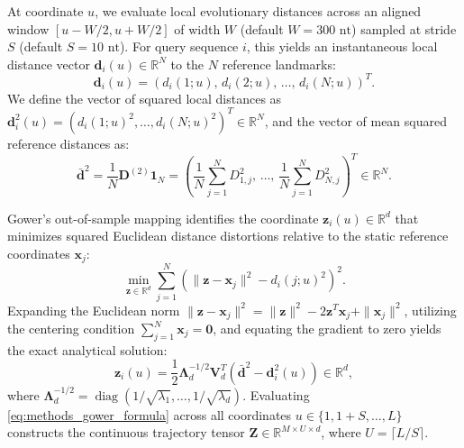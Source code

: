 At coordinate $u$, we evaluate local evolutionary distances across an aligned window $[u - W/2, u + W/2]$ of width $W$ (default $W = 300\text{ nt}$) sampled at stride $S$ (default $S = 10\text{ nt}$).
For query sequence $i$, this yields an instantaneous local distance vector $\mathbf{d}_i(u) \in \mathbb{R}^N$ to the $N$ reference landmarks:
\begin{equation}
\mathbf{d}_i(u) = \left(d_i(1; u), \, d_i(2; u), \, \dots, \, d_i(N; u)\right)^T.
\label{eq:methods_local_dist_vec}
\end{equation}
We define the vector of squared local distances as $\mathbf{d}_i^2(u) = (d_i(1; u)^2, \dots, d_i(N; u)^2)^T \in \mathbb{R}^N$, and the vector of mean squared reference distances as:
\begin{equation}
\bar{\mathbf{d}}^2 = \frac{1}{N} \mathbf{D}^{(2)} \mathbf{1}_N = \left( \frac{1}{N} \sum_{j=1}^N D_{1, j}^2, \, \dots, \, \frac{1}{N} \sum_{j=1}^N D_{N, j}^2 \right)^T \in \mathbb{R}^N.
\label{eq:methods_mean_sq_dist}
\end{equation}

Gower's out-of-sample mapping identifies the coordinate $\mathbf{z}_i(u) \in \mathbb{R}^d$ that minimizes squared Euclidean distance distortions relative to the static reference coordinates $\mathbf{x}_j$:
\begin{equation}
\min_{\mathbf{z} \in \mathbb{R}^d} \sum_{j=1}^N \left( \|\mathbf{z} - \mathbf{x}_j\|^2 - d_i(j; u)^2 \right)^2.
\label{eq:methods_gower_objective}
\end{equation}
Expanding the Euclidean norm $\|\mathbf{z} - \mathbf{x}_j\|^2 = \|\mathbf{z}\|^2 - 2 \mathbf{z}^T \mathbf{x}_j + \|\mathbf{x}_j\|^2$, utilizing the centering condition $\sum_{j=1}^N \mathbf{x}_j = \mathbf{0}$, and equating the gradient to zero yields the exact analytical solution:
\begin{equation}
\mathbf{z}_i(u) = \frac{1}{2} \mathbf{\Lambda}_d^{-1/2} \mathbf{V}_d^T \left( \bar{\mathbf{d}}^2 - \mathbf{d}_i^2(u) \right) \in \mathbb{R}^d,
\label{eq:methods_gower_formula}
\end{equation}
where $\mathbf{\Lambda}_d^{-1/2} = \operatorname{diag}(1/\sqrt{\lambda_1}, \dots, 1/\sqrt{\lambda_d})$.
Evaluating \eqref{eq:methods_gower_formula} across all coordinates $u \in \{1, 1+S, \dots, L\}$ constructs the continuous trajectory tensor $\mathbf{Z} \in \mathbb{R}^{M \times U \times d}$, where $U = \lceil L/S \rceil$.

